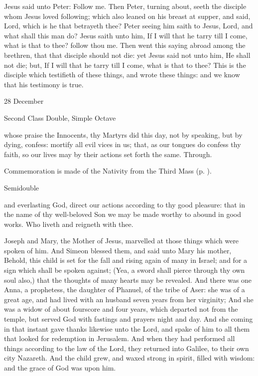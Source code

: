  Jesus said unto Peter: Follow me. Then Peter, turning about, seeth the disciple whom Jesus loved following; which also leaned on his breast at supper, and said, Lord, which is he that betrayeth thee? Peter seeing him saith to Jesus, Lord, and what shall this man do? Jesus saith unto him, If I will that he tarry till I come, what is that to thee? follow thou me. Then went this saying abroad among the brethren, that that disciple should not die: yet Jesus said not unto him, He shall not die; but, If I will that he tarry till I come, what is that to thee? This is the disciple which testifieth of these things, and wrote these things: and we know that his testimony is true.


\begin{inhead}
{28 December}\par
{Second Class Double, Simple Octave}
\end{inhead}

\collect
{} whose praise the Innocents, thy Martyrs did this day, not by speaking, but by dying, confess: mortify all evil vices in us; that, as our tongues do confess thy faith, so our lives may by their actions set forth the same. Through.
\begin{rubric}
    Commemoration is made of the Nativity from the Third Mass (p. \pageref{NativityMassIII}).
\end{rubric}

\begin{inhead}
{Semidouble}
\end{inhead}

\collect
{} and everlasting God, direct our actions according to thy good pleasure: that in the name of thy well-beloved Son we may be made worthy to abound in good works. Who liveth and reigneth with thee.

 Joseph and Mary, the Mother of Jesus, marvelled at those things which were spoken of him. And Simeon blessed them, and said unto Mary his mother, Behold, this child is set for the fall and rising again of many in Israel; and for a sign which shall be spoken against; (Yea, a sword shall pierce through thy own soul also,) that the thoughts of many hearts may be revealed. And there was one Anna, a prophetess, the daughter of Phanuel, of the tribe of Aser: she was of a great age, and had lived with an husband seven years from her virginity; And she was a widow of about fourscore and four years, which departed not from the temple, but served God with fastings and prayers night and day. And she coming in that instant gave thanks likewise unto the Lord, and spake of him to all them that looked for redemption in Jerusalem. And when they had performed all things according to the law of the Lord, they returned into Galilee, to their own city Nazareth. And the child grew, and waxed strong in spirit, filled with wisdom: and the grace of God was upon him.

